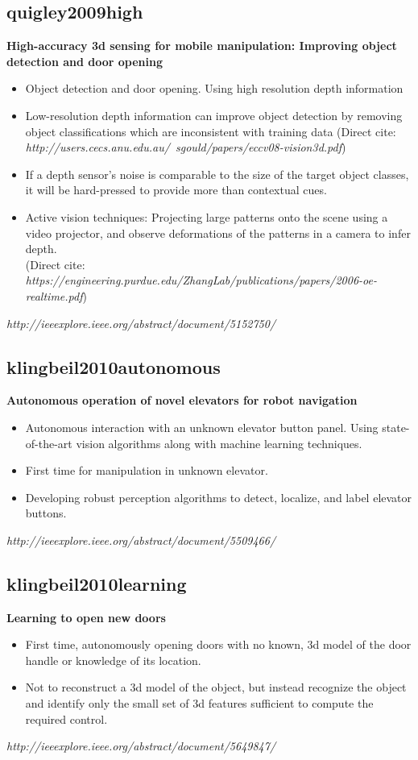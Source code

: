 \subsection{quigley2009high}
\textbf{High-accuracy 3d sensing for mobile manipulation: Improving object detection and door opening}
\begin{itemize}
\item Object detection and door opening. Using high resolution depth information 
\item Low-resolution depth information can improve object detection by removing object classifications which are inconsistent with training data
(Direct cite: \textit{http://users.cecs.anu.edu.au/~sgould/papers/eccv08-vision3d.pdf})
\item If a depth sensor's noise is comparable to the size of the target object classes, it will be hard-pressed to provide more than contextual cues. 
\item Active vision techniques: Projecting large patterns onto the scene using a video projector, and observe deformations of the patterns in a camera to infer depth. \\
(Direct cite: \textit{https://engineering.purdue.edu/ZhangLab/publications/papers/2006-oe-realtime.pdf})
\end{itemize}
\textit{http://ieeexplore.ieee.org/abstract/document/5152750/}



\subsection{klingbeil2010autonomous}
\textbf{Autonomous operation of novel elevators for robot navigation}
\begin{itemize}
\item Autonomous interaction with an unknown elevator button panel. Using state-of-the-art vision algorithms along with machine learning techniques.  
\item First time for manipulation in unknown elevator. 
\item Developing robust perception algorithms to detect, localize, and label elevator buttons. 
\end{itemize}
\textit{http://ieeexplore.ieee.org/abstract/document/5509466/}



\subsection{klingbeil2010learning}
\textbf{Learning to open new doors}
\begin{itemize}
\item First time, autonomously opening doors with no known, 3d model of the door handle or knowledge of its location. 
\item Not to reconstruct a 3d model of the object, but instead recognize the object and identify only the small set of 3d features sufficient to compute the required control. 
\end{itemize}
\textit{http://ieeexplore.ieee.org/abstract/document/5649847/}



